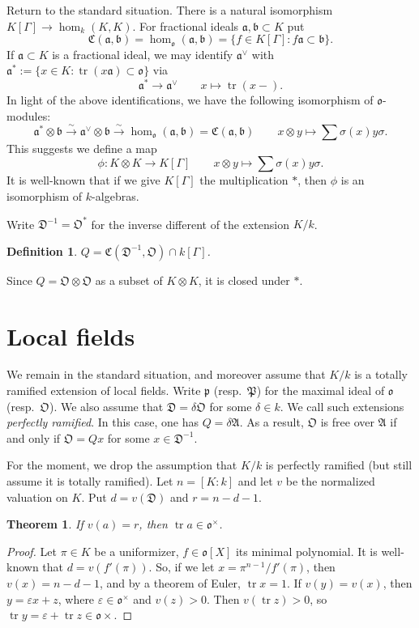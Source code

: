 \documentclass{article}
\DeclareMathOperator{\trace}{tr}
\newcommand{\fa}{\mathfrak{a}}
\newcommand{\fA}{\mathfrak{A}}
\newcommand{\fb}{\mathfrak{b}}
\newcommand{\fC}{\mathfrak{C}}
\newcommand{\fD}{\mathfrak{D}}
\newcommand{\fo}{\mathfrak{o}}
\newcommand{\fO}{\mathfrak{O}}
\newcommand{\fp}{\mathfrak{p}}
\newcommand{\fP}{\mathfrak{P}}
\newcommand{\iso}{\xrightarrow\sim}
\newtheorem{definition}[subsection]{Definition}
\newtheorem{theorem}[subsection]{Theorem}
\begin{document}
Return to the standard situation. There is a natural isomorphism  
$K[\Gamma]\to \hom_k(K,K)$. For fractional ideals $\fa,\fb\subset K$ put 
\[
  \fC(\fa,\fb) = \hom_\fo(\fa,\fb) = \{f\in K[\Gamma]:f\fa\subset \fb\} .
\]
If $\fa\subset K$ is a fractional ideal, we may identify $\fa^\vee$ with 
$\fa^\ast:=\{x\in K:\trace(x\fa)\subset \fo\}$ via 
\[
  \fa^\ast \to \fa^\vee \qquad x\mapsto \trace(x-) .
\]
In light of the above identifications, we have the following isomorphism of 
$\fo$-modules: 
\[
  \fa^\ast\otimes \fb \iso \fa^\vee\otimes \fb \iso \hom_\fo(\fa,\fb)=\fC(\fa,\fb) \qquad x\otimes y\mapsto \sum \sigma(x) y\sigma .
\]
This suggests we define a map 
\[
  \phi:K\otimes K\to K[\Gamma] \qquad x\otimes y\mapsto \sum \sigma(x) y \sigma .
\]
It is well-known that if we give $K[\Gamma]$ the multiplication $\ast$, then 
$\phi$ is an isomorphism of $k$-algebras. 

Write $\fD^{-1}=\fO^\ast$ for the inverse different of the extension $K/k$. 

\begin{definition}
$Q=\fC(\fD^{-1},\fO)\cap k[\Gamma]$. 
\end{definition}

Since $Q=\fO\otimes \fO$ as a subset of $K\otimes K$, it is closed under 
$\ast$. 





\section{Local fields}

We remain in the standard situation, and moreover assume that $K/k$ is a 
totally ramified extension of local fields. Write $\fp$ (resp.~$\fP$) for the 
maximal ideal of $\fo$ (resp.~$\fO$). We also assume that 
$\fD=\delta\fO$ for some $\delta\in k$. We call such extensions \emph{perfectly 
ramified}. In this case, one has $Q=\delta\fA$. As a result, $\fO$ is free over 
$\fA$ if and only if $\fO=Qx$ for some $x\in \fD^{-1}$. 

For the moment, we drop the assumption that $K/k$ is perfectly ramified (but 
still assume it is totally ramified). Let $n=[K:k]$ and let $v$ be the 
normalized valuation on $K$. Put $d=v(\fD)$ and $r=n-d-1$. 

\begin{theorem}
If $v(a)=r$, then $\trace a\in \fo^\times$. 
\end{theorem}
\begin{proof}
Let $\pi\in K$ be a uniformizer, $f\in \fo[X]$ its minimal polynomial. It is 
well-known that $d=v(f'(\pi))$. So, if we let $x=\pi^{n-1}/f'(\pi)$, then 
$v(x)=n-d-1$, and by a theorem of Euler, $\trace x=1$. If $v(y)=v(x)$, then 
$y=\varepsilon x+z$, where $\varepsilon\in \fo^\times$ and $v(z)>0$. Then 
$v(\trace z)>0$, so $\trace y=\varepsilon + \trace z\in \fo\times$. 
\end{proof}
\end{document}
